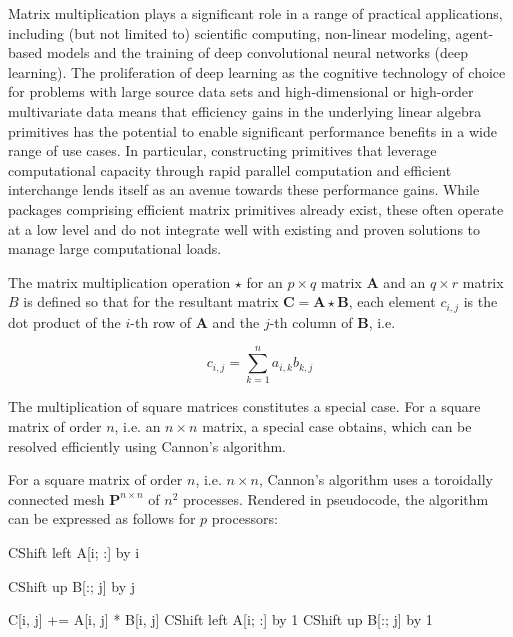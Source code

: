 \documentclass[bdcc,article,submit,moreauthors,pdftex]{Definitions/mdpi}
\begin{document}
Matrix multiplication plays a significant role in a range of practical applications, including (but not limited to) scientific computing, non-linear modeling, agent-based models and the training of deep convolutional neural networks (deep learning). The proliferation of deep learning as the cognitive technology of choice for problems with large source data sets and high-dimensional or high-order multivariate data means that efficiency gains in the underlying linear algebra primitives has the potential to enable significant performance benefits in a wide range of use cases. In particular, constructing primitives that leverage computational capacity through rapid parallel computation and efficient interchange lends itself as an avenue towards these performance gains. While packages comprising efficient matrix primitives already exist,\cite{chetlur2014cudnn} these often operate at a low level and do not integrate well with existing and proven solutions to manage large computational loads.


The matrix multiplication operation $\star$ for an $p \times q$ matrix $\mathbf{A}$ and an $q \times r$ matrix $B$ is defined so that for the resultant matrix $\mathbf{C} = \mathbf{A} \star \mathbf{B}$, each element $c_{i, j}$ is the dot product of the $i$-th row of $\mathbf{A}$ and the $j$-th column of $\mathbf{B}$, i.e.

\begin{equation}
	c_{i, j} = \sum_{k = 1}^n a_{i, k} b_{k, j}
\end{equation}

The multiplication of square matrices constitutes a special case. For a square matrix of order $n$, i.e. an $n \times n$ matrix, a special case obtains, which can be resolved efficiently using Cannon's algorithm.\cite{cannon1969cellular} 

For a square matrix of order $n$, i.e. $n \times n$, Cannon's algorithm uses a toroidally connected mesh $\mathbf{P}^{n \times n}$ of $n^2$ processes. Rendered in pseudocode, the algorithm can be expressed as follows for $p$ processors:

\begin{algorithmic}
		\State CShift left A[i; :] by i 
	\EndFor
	
		\State CShift up B[:; j] by j 
	\EndFor
	
			\State C[i, j] += A[i, j] * B[i, j]
			\State CShift left A[i; :] by 1
			\State CShift up B[:; j] by 1
		\EndFor
	\EndFor
\end{algorithmic}
\end{document}
